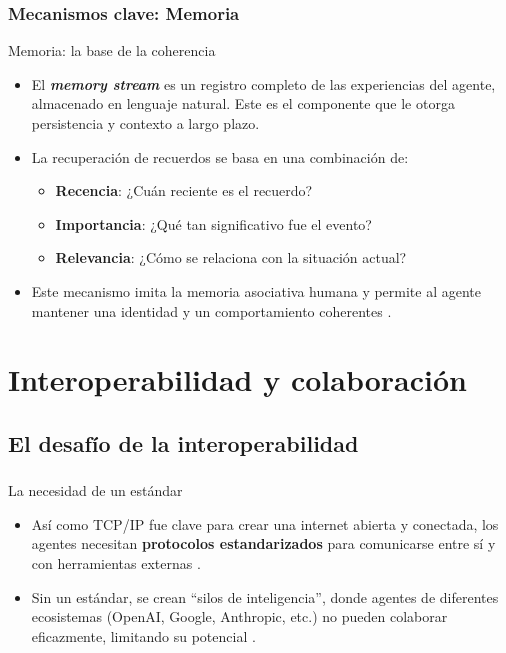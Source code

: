 \documentclass[handout]{beamer}
\begin{document}
\begin{frame}
    \frametitle{Mecanismos clave: Memoria}
  \begin{alertblock}{Memoria: la base de la coherencia}
  \begin{itemize}
    \item El \textbf{\textit{memory stream}} es un registro completo de las experiencias del agente, almacenado en lenguaje natural. Este es el componente que le otorga persistencia y contexto a largo plazo.
    \item La recuperación de recuerdos se basa en una combinación de:
    \begin{itemize}
        \item \textbf{Recencia}: ¿Cuán reciente es el recuerdo?
        \item \textbf{Importancia}: ¿Qué tan significativo fue el evento?
        \item \textbf{Relevancia}: ¿Cómo se relaciona con la situación actual?
    \end{itemize}
    \item Este mecanismo imita la memoria asociativa humana y permite al agente mantener una identidad y un comportamiento coherentes \parencite{park2023generativeagentsinteractivesimulacra}.
  \end{itemize}
  \end{alertblock}
\end{frame}

\section{Interoperabilidad y colaboración}
\subsection{El desafío de la interoperabilidad}
\begin{frame}
  \frametitle{\insertsubsectionhead}
  \begin{block}{La necesidad de un estándar}
    \begin{itemize}
        \item Así como TCP/IP fue clave para crear una internet abierta y conectada, los agentes necesitan \textbf{protocolos estandarizados} para comunicarse entre sí y con herramientas externas \parencite{yang2025surveyaiagentprotocols}.
        \item Sin un estándar, se crean ``silos de inteligencia'', donde agentes de diferentes ecosistemas (OpenAI, Google, Anthropic, etc.) no pueden colaborar eficazmente, limitando su potencial \parencite{ehtesham2025surveyagentinteroperabilityprotocols}.
    \end{itemize}
  \end{block}
\end{frame}
\end{document}
